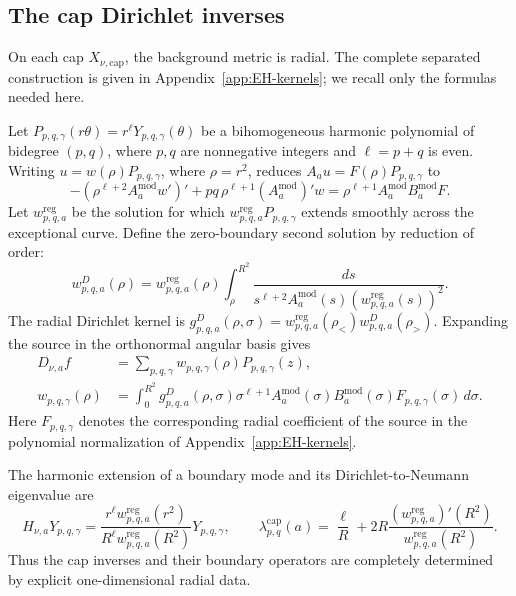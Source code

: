 \documentclass[11pt,a4paper,twoside]{article}
\numberwithin{equation}{section}
\theoremstyle{definition}
\theoremstyle{remark}
\begin{document}
\subsection{The cap Dirichlet inverses}
\label{subsec:cap-dirichlet}

On each cap \(X_{\nu,\mathrm{cap}}\), the background metric is radial.
The complete separated construction is given in
Appendix~\ref{app:EH-kernels}; we recall only the formulas needed
here.

Let \(P_{p,q,\gamma}(r\theta)=r^\ell Y_{p,q,\gamma}(\theta)\)
be a bihomogeneous harmonic polynomial of bidegree \((p,q)\),
where \(p,q\) are nonnegative integers and \(\ell=p+q\) is even.
Writing \(u=w(\rho)P_{p,q,\gamma}\), where \(\rho=r^2\), reduces
\(A_au=F(\rho)P_{p,q,\gamma}\) to
\begin{equation}\label{eq:cap-SL}
-
\left(
\rho^{\ell+2}A_a^{\mathrm{mod}}w'
\right)'
+
pq\,\rho^{\ell+1}
(A_a^{\mathrm{mod}})'w
=
\rho^{\ell+1}
A_a^{\mathrm{mod}}
B_a^{\mathrm{mod}}
F.
\end{equation}
Let \(w_{p,q,a}^{\mathrm{reg}}\) be the solution for which \(w_{p,q,a}^{\mathrm{reg}} P_{p,q,\gamma}\) extends smoothly across the exceptional curve.  Define the
zero-boundary second solution by reduction of order:
\[
w_{p,q,a}^{D}(\rho)
=
w_{p,q,a}^{\mathrm{reg}}(\rho)
\int_\rho^{R^2}
\frac{
ds
}{
s^{\ell+2}
A_a^{\mathrm{mod}}(s)
\left(
w_{p,q,a}^{\mathrm{reg}}(s)
\right)^2
}.
\]
The radial Dirichlet kernel is
\(g_{p,q,a}^{D}(\rho,\sigma)=
w_{p,q,a}^{\mathrm{reg}}(\rho_<)w_{p,q,a}^{D}(\rho_>)\).
Expanding the source in the orthonormal angular basis gives
\[
\begin{aligned}
D_{\nu,a}f&=\sum_{p,q,\gamma}
w_{p,q,\gamma}(\rho)P_{p,q,\gamma}(z),\\
w_{p,q,\gamma}(\rho)&=
\int_0^{R^2}g_{p,q,a}^{D}(\rho,\sigma)
\sigma^{\ell+1}A_a^{\mathrm{mod}}(\sigma)B_a^{\mathrm{mod}}(\sigma)
F_{p,q,\gamma}(\sigma)\,d\sigma.
\end{aligned}
\]
Here \(F_{p,q,\gamma}\) denotes the corresponding radial coefficient
of the source in the polynomial normalization of
Appendix~\ref{app:EH-kernels}.

The harmonic extension of a boundary mode and its
Dirichlet-to-Neumann eigenvalue are
\[
H_{\nu,a}Y_{p,q,\gamma}=
\frac{r^\ell w_{p,q,a}^{\mathrm{reg}}(r^2)}
{R^\ell w_{p,q,a}^{\mathrm{reg}}(R^2)}Y_{p,q,\gamma},\qquad
\lambda_{p,q}^{\mathrm{cap}}(a)=\frac{\ell}{R}
+2R\frac{(w_{p,q,a}^{\mathrm{reg}})'(R^2)}
{w_{p,q,a}^{\mathrm{reg}}(R^2)}.
\]
Thus the cap inverses and their boundary operators are completely
determined by explicit one-dimensional radial data.
\end{document}
